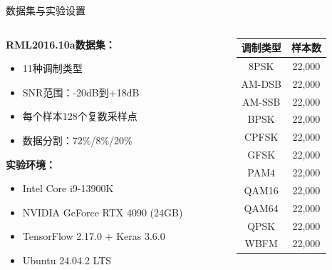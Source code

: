 \documentclass[aspectratio=169]{beamer}
\begin{document}
\begin{frame}{数据集与实验设置}
\begin{columns}
\begin{column}{0.6\textwidth}
\textbf{RML2016.10a数据集：}
\begin{itemize}
\item 11种调制类型
\item SNR范围：-20dB到+18dB
\item 每个样本128个复数采样点
\item 数据分割：72\%/8\%/20\%
\end{itemize}

\textbf{实验环境：}
\begin{itemize}
\item Intel Core i9-13900K
\item NVIDIA GeForce RTX 4090 (24GB)
\item TensorFlow 2.17.0 + Keras 3.6.0
\item Ubuntu 24.04.2 LTS
\end{itemize}
\end{column}
\begin{column}{0.4\textwidth}
\begin{table}[h]
\centering
\scriptsize
\begin{tabular}{@{}cc@{}}
\toprule
调制类型 & 样本数 \\
\midrule
8PSK & 22,000 \\
AM-DSB & 22,000 \\
AM-SSB & 22,000 \\
BPSK & 22,000 \\
CPFSK & 22,000 \\
GFSK & 22,000 \\
PAM4 & 22,000 \\
QAM16 & 22,000 \\
QAM64 & 22,000 \\
QPSK & 22,000 \\
WBFM & 22,000 \\
\bottomrule
\end{tabular}
\end{table}
\end{column}
\end{columns}
\end{frame}
\end{document}
